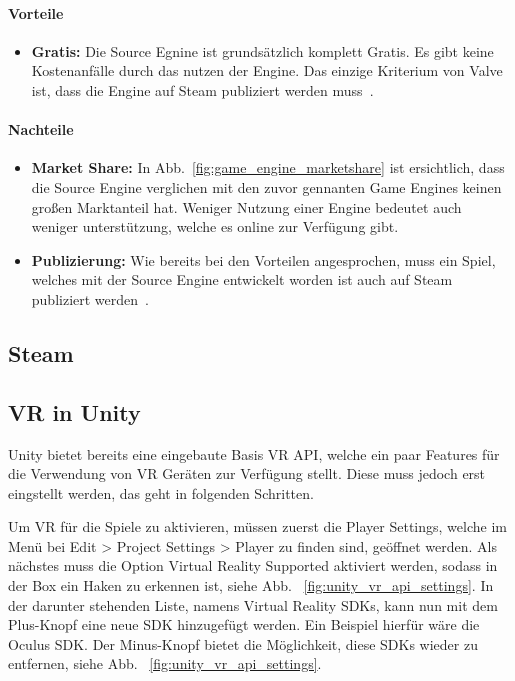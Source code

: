 \paragraph{Vorteile}

\begin{itemize}
    \item \textbf{Gratis:} Die Source Egnine ist grundsätzlich komplett Gratis.
    Es gibt keine Kostenanfälle durch das nutzen der Engine.
    Das einzige Kriterium von Valve ist, dass die Engine auf Steam publiziert werden muss~\cite{Brenna_Hillier_2015}.
\end{itemize}


\paragraph{Nachteile}\label{pgr:cons}

\begin{itemize}
    \item \textbf{Market Share:} In Abb.~\ref{fig:game_engine_marketshare} ist ersichtlich, dass die Source Engine verglichen mit den zuvor gennanten Game Engines keinen großen Marktanteil hat.
    Weniger Nutzung einer Engine bedeutet auch weniger unterstützung, welche es online zur Verfügung gibt.
    \item \textbf{Publizierung:} Wie bereits bei den Vorteilen angesprochen, muss ein Spiel, welches mit der Source Engine entwickelt worden ist auch auf Steam publiziert werden~\cite{Brenna_Hillier_2015}.
\end{itemize}

\subsection{Steam}\label{subsec:steam}

\subsection{VR in Unity}
Unity bietet bereits eine eingebaute Basis VR API, welche ein paar Features für die Verwendung von VR Geräten zur Verfügung stellt.
Diese muss jedoch erst eingstellt werden, das geht in folgenden Schritten.

Um VR für die Spiele zu aktivieren, müssen zuerst die Player Settings, welche im Menü bei Edit > Project Settings > Player zu finden sind, geöffnet werden.
Als nächstes muss die Option Virtual Reality Supported aktiviert werden, sodass in der Box ein Haken zu erkennen ist, siehe Abb. ~\ref{fig:unity_vr_api_settings}.
In der darunter stehenden Liste, namens Virtual Reality SDKs, kann nun mit dem Plus-Knopf eine neue SDK hinzugefügt werden.
Ein Beispiel hierfür wäre die Oculus SDK.
Der Minus-Knopf bietet die Möglichkeit, diese SDKs wieder zu entfernen, siehe Abb. ~\ref{fig:unity_vr_api_settings}.
~\cite{Unity_VR_Overview_2022}

